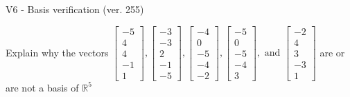 \begin{exercise}
  \begin{exerciseTitle}V6 - Basis verification (ver. 255)\end{exerciseTitle}
  \begin{exerciseStatement}
    Explain why the vectors \(\left[\begin{array}{r}
-5 \\
4 \\
4 \\
-1 \\
1
\end{array}\right] , \left[\begin{array}{r}
-3 \\
-3 \\
2 \\
-1 \\
-5
\end{array}\right] , \left[\begin{array}{r}
-4 \\
0 \\
-5 \\
-4 \\
-2
\end{array}\right] , \left[\begin{array}{r}
-5 \\
0 \\
-5 \\
-4 \\
3
\end{array}\right] , \text{ and } \left[\begin{array}{r}
-2 \\
4 \\
3 \\
-3 \\
1
\end{array}\right]\) are or are not a basis of \(\mathbb{R}^5\)	



\end{exerciseStatement}
\end{exercise}
